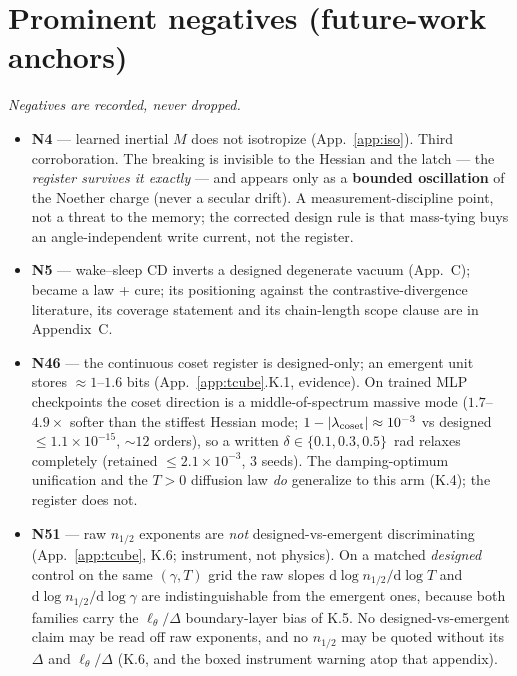 \documentclass[10pt]{article}
\begin{document}
\section{Prominent negatives (future-work anchors)}\label{app:neg}
\emph{Negatives are recorded, never dropped.}
\begin{itemize}\itemsep2pt
\item \textbf{N4} --- learned inertial $M$ does not isotropize (App.~\ref{app:iso}). Third corroboration. The breaking is invisible to the Hessian and the latch --- the \emph{register survives it exactly} --- and appears only as a \textbf{bounded oscillation} of the Noether charge (never a secular drift). A measurement-discipline point, not a threat to the memory; the corrected design rule is that mass-tying buys an angle-independent write current, not the register.
\item \textbf{N5} --- wake--sleep CD inverts a designed degenerate vacuum (App.~C); became a law + cure; its positioning against the contrastive-divergence literature, its coverage statement and its chain-length scope clause are in Appendix~C.
\item \textbf{N46} --- the continuous coset register is designed-only; an emergent unit stores $\approx1$--$1.6$ bits (App.~\ref{app:tcube}.K.1, evidence). On trained MLP checkpoints the coset direction is a middle-of-spectrum massive mode ($1.7$--$4.9\times$ softer than the stiffest Hessian mode; $1-|\lambda_{\rm coset}|\approx10^{-3}$ vs designed $\le1.1{\times}10^{-15}$, $\sim\!12$ orders), so a written $\delta\in\{0.1,0.3,0.5\}$~rad relaxes completely (retained $\le2.1{\times}10^{-3}$, $3$ seeds). The damping-optimum unification and the $T>0$ diffusion law \emph{do} generalize to this arm (K.4); the register does not.
\item \textbf{N51} --- raw $n_{1/2}$ exponents are \emph{not} designed-vs-emergent discriminating (App.~\ref{app:tcube}, K.6; instrument, not physics). On a matched \emph{designed} control on the same $(\gamma,T)$ grid the raw slopes $\mathrm{d}\log n_{1/2}/\mathrm{d}\log T$ and $\mathrm{d}\log n_{1/2}/\mathrm{d}\log\gamma$ are indistinguishable from the emergent ones, because both families carry the $\ell_\theta/\Delta$ boundary-layer bias of K.5. No designed-vs-emergent claim may be read off raw exponents, and no $n_{1/2}$ may be quoted without its $\Delta$ and $\ell_\theta/\Delta$ (K.6, and the boxed instrument warning atop that appendix).

\end{itemize}
\end{document}
